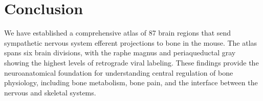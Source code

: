 \documentclass[12pt]{article}
\begin{document}
\section{Conclusion}

We have established a comprehensive atlas of 87 brain regions that send sympathetic nervous system efferent projections to bone in the mouse. The atlas spans six brain divisions, with the raphe magnus and periaqueductal gray showing the highest levels of retrograde viral labeling. These findings provide the neuroanatomical foundation for understanding central regulation of bone physiology, including bone metabolism, bone pain, and the interface between the nervous and skeletal systems.



\end{document}
